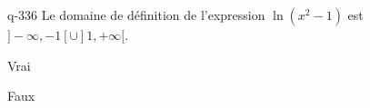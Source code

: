 \begin{truefalse}{q-336}
Le domaine de définition de l'expression $\ln(x^2-1)$ est $]-\infty,-1[\cup ]1,+\infty[$.
\item* Vrai
\item Faux
\end{truefalse}


